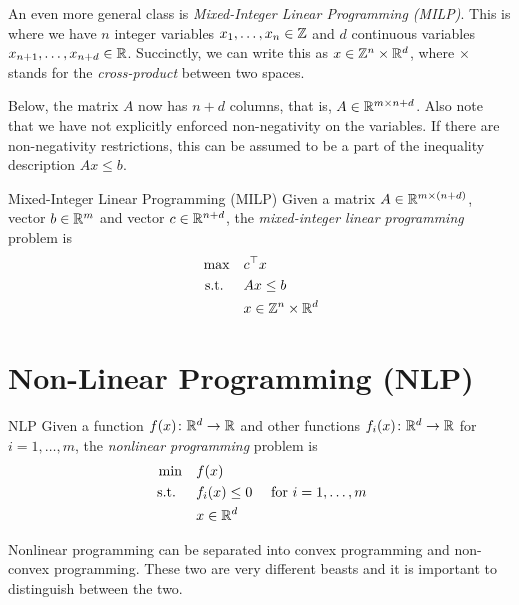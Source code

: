 \documentclass[../open-optimization/open-optimization.tex]{subfiles}
\begin{document}
An even more general class is \emph{Mixed-Integer Linear Programming (MILP)}.  This is where we have $n$ integer variables $x_1, \dots, x_n \in {\mathbb{Z}}$ and $d$ continuous variables $x_{n+1}, \dots, x_{n+d} \in {\mathbb{R}}$.  Succinctly, we can write this as $x \in {\mathbb{Z}}^n \times {\mathbb{R}}^d$, where $\times$ stands for the \emph{cross-product} between two spaces.   

Below, the matrix $A$ now has $n+d$ columns, that is, $A \in {\mathbb{R}}^{m \times n+d}$.  Also note that we have not explicitly enforced non-negativity on the variables.  If there are non-negativity restrictions, this can be assumed to be a part of the inequality description $Ax \leq b$.
\begin{general}{Mixed-Integer Linear Programming (MILP)}{\npcomplete}
Given a matrix $A \in {\mathbb{R}}^{m\times (n+d)}$, vector $b \in {\mathbb{R}}^m$ and vector $c \in {\mathbb{R}}^{n+d}$, the \emph{mixed-integer linear programming} problem is
\begin{equation}
\label{eq:ILP}
\begin{split}
\max \quad & c^\top x\\
\text{ s.t. }  \quad & Ax \leq b\\
& x \in {\mathbb{Z}}^n \times {\mathbb{R}}^d
\end{split}
\end{equation}
\end{general}

\section{Non-Linear Programming (NLP)}
\begin{general}{NLP}{\nphard}
Given a function $f(x)\colon {\mathbb{R}}^d \to {\mathbb{R}}$ and other functions $f_i(x)\colon {\mathbb{R}}^d \to {\mathbb{R}}$ for $i=1, \dots, m$,  the \emph{nonlinear programming} problem is
\begin{equation}
\label{eq:convex-programming}
\begin{split}
\min \quad & f(x)\\
\text{ s.t. }  \quad & f_i(x) \leq 0  \quad  \text{ for } i=1, \dots, m\\
& x \in {\mathbb{R}}^d
\end{split}
\end{equation}
\end{general}


Nonlinear programming can be separated into convex programming and non-convex programming.  These two are very different beasts and it is important to distinguish between the two.
\end{document}
